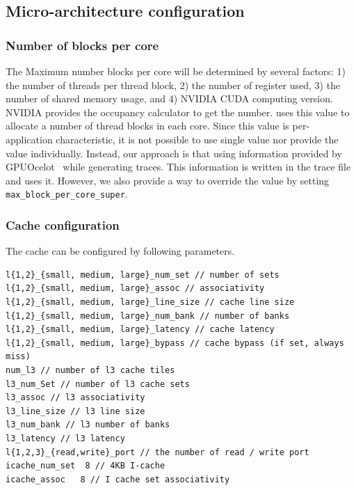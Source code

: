 \subsection{Micro-architecture configuration}

\subsubsection{Number of blocks per core}

The Maximum number blocks per core will be determined by several
factors: 1) the number of threads per thread block, 2) the number of
register used, 3) the number of shared memory usage, and 4) NVIDIA
CUDA computing version. NVIDIA provides the occupancy calculator to
get the number. \SIM uses this value to allocate a number of thread
blocks in each core. Since this value is per-application
characteristic, it is not possible to use single value nor provide the
value individually. Instead, our approach is that using information
provided by GPUOcelot~\cite{ocelot} while generating traces. This
information is written in the trace file and \SIM uses it. However, we
also provide a way to override the value by
setting \Verb+max_block_per_core_super+.



\subsubsection{Cache configuration}

The cache can be configured by following parameters.

\begin{Verbatim}
l{1,2}_{small, medium, large}_num_set // number of sets
l{1,2}_{small, medium, large}_assoc // associativity
l{1,2}_{small, medium, large}_line_size // cache line size
l{1,2}_{small, medium, large}_num_bank // number of banks  
l{1,2}_{small, medium, large}_latency // cache latency
l{1,2}_{small, medium, large}_bypass // cache bypass (if set, always miss)
num_l3 // number of l3 cache tiles
l3_num_Set // number of l3 cache sets
l3_assoc // l3 associativity
l3_line_size // l3 line size
l3_num_bank // l3 number of banks
l3_latency // l3 latency
l{1,2,3}_{read,write}_port // the number of read / write port
icache_num_set  8 // 4KB I-cache 
icache_assoc   8 // I cache set associativity 
\end{Verbatim}


